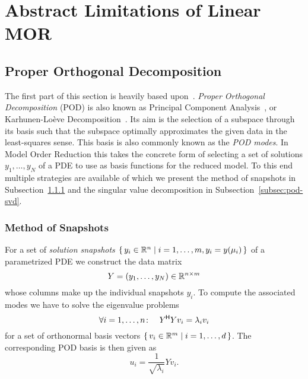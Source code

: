 \section{Abstract Limitations of Linear MOR}\label{sec:limitations-linear-mor}

\subsection{Proper Orthogonal Decomposition}\label{subsec:pod}

The first part of this section is heavily based upon~\cite{Pinnau2008}.
\emph{Proper Orthogonal Decomposition} (POD) is also known as Principal Component Analysis~\cite{Hotelling1936}, or Karhunen-Loève Decomposition~\cite{Karhunen1946}.
Its aim is the selection of a subspace through its basis such that the subspace optimally approximates the given data in the least-squares sense.
This basis is also commonly known as the \emph{POD modes}.
In Model Order Reduction this takes the concrete form of selecting a set of solutions $y_1, \dots, y_N$ of a PDE to use as basis functions for the reduced model.
To this end multiple strategies are available of which we present the method of snapshots in Subsection~\ref{subsec:pod-snapshots} and the singular value decomposition in Subsection~\ref{subsec:pod-svd}.

\subsubsection{Method of Snapshots}\label{subsec:pod-snapshots}

For a set of \emph{solution snapshots} $\left\{\,y_i \in \mathbb{R}^n\mid i = 1, \dots, m, y_i = y(\mu_i)\,\right\}$ of a parametrized PDE we construct the data matrix
\begin{equation}\label{eq:pod-data-matrix}
    Y = \left( y_1, \dots, y_N \right) \in \mathbb{R}^{n \times m}
\end{equation}
whose columns make up the individual snapshots $y_i$.
To compute the associated modes we have to solve the eigenvalue problems
\begin{equation*}
    \forall i = 1, \dots, n \colon\quad Y^{\mkern-1.5mu \mathsf{H}} Y v_i = \lambda_i v_i
\end{equation*}
for a set of orthonormal basis vectors $\left\{\,v_i \in \mathbb{R}^m\mid i = 1, \dots, d\,\right\}$.
The corresponding POD basis is then given as
\begin{equation*}
    u_i = \frac{1}{\sqrt{\lambda_i}} Y v_i.
\end{equation*}

